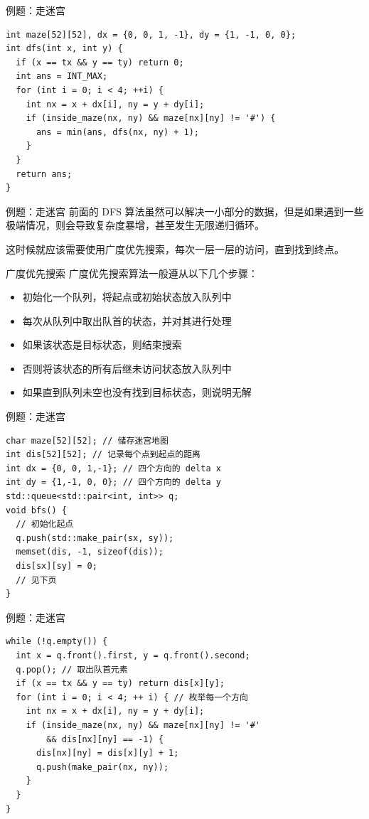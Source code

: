 \documentclass[12pt,aspectratio=169]{beamer}
\begin{document}
\begin{frame}[fragile]{例题：走迷宫}
  \begin{verbatim}
int maze[52][52], dx = {0, 0, 1, -1}, dy = {1, -1, 0, 0};
int dfs(int x, int y) {
  if (x == tx && y == ty) return 0;
  int ans = INT_MAX;
  for (int i = 0; i < 4; ++i) {
    int nx = x + dx[i], ny = y + dy[i];
    if (inside_maze(nx, ny) && maze[nx][ny] != '#') {
      ans = min(ans, dfs(nx, ny) + 1);
    }
  }
  return ans;
}
  \end{verbatim}
\end{frame}

\begin{frame}[fragile]{例题：走迷宫}
  前面的 DFS 算法虽然可以解决一小部分的数据，但是如果遇到一些极端情况，则会导致复杂度暴增，甚至发生无限递归循环。

  这时候就应该需要使用广度优先搜索，每次一层一层的访问，直到找到终点。
\end{frame}


\begin{frame}[fragile]{广度优先搜索}
  广度优先搜索算法一般遵从以下几个步骤：
  
  \begin{itemize}
    \item 初始化一个队列，将起点或初始状态放入队列中
    \item 每次从队列中取出队首的状态，并对其进行处理
    \item 如果该状态是目标状态，则结束搜索
    \item 否则将该状态的所有后继未访问状态放入队列中
    \item 如果直到队列未空也没有找到目标状态，则说明无解
  \end{itemize}
\end{frame}

\begin{frame}[fragile]{例题：走迷宫}
  \begin{verbatim}
char maze[52][52]; // 储存迷宫地图
int dis[52][52]; // 记录每个点到起点的距离
int dx = {0, 0, 1,-1}; // 四个方向的 delta x
int dy = {1,-1, 0, 0}; // 四个方向的 delta y
std::queue<std::pair<int, int>> q;
void bfs() {
  // 初始化起点
  q.push(std::make_pair(sx, sy));
  memset(dis, -1, sizeof(dis));
  dis[sx][sy] = 0;
  // 见下页
}
  \end{verbatim}
\end{frame}

\begin{frame}[fragile]{例题：走迷宫}
  \begin{verbatim}
while (!q.empty()) {
  int x = q.front().first, y = q.front().second;
  q.pop(); // 取出队首元素
  if (x == tx && y == ty) return dis[x][y];
  for (int i = 0; i < 4; ++ i) { // 枚举每一个方向
    int nx = x + dx[i], ny = y + dy[i];
    if (inside_maze(nx, ny) && maze[nx][ny] != '#'
        && dis[nx][ny] == -1) {
      dis[nx][ny] = dis[x][y] + 1;
      q.push(make_pair(nx, ny));
    }
  }
}
  \end{verbatim}
\end{frame}
\end{document}
